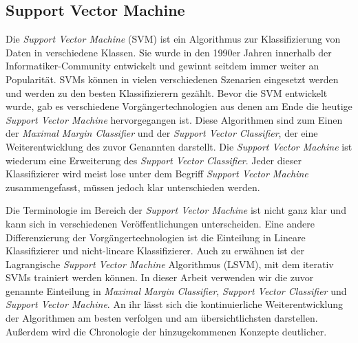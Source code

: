 \subsection{Support Vector Machine} \label{ssec:svm}
Die \textit{Support Vector Machine} (SVM) ist ein Algorithmus zur Klassifizierung von Daten in verschiedene Klassen.
Sie wurde in den 1990er Jahren innerhalb der Informatiker-Community entwickelt und gewinnt seitdem immer weiter an Popularität.
SVMs können in vielen verschiedenen Szenarien eingesetzt werden und werden zu den besten Klassifizierern gezählt.
Bevor die SVM entwickelt wurde, gab es verschiedene Vorgängertechnologien aus denen am Ende die heutige \textit{Support Vector Machine} hervorgegangen ist. 
Diese Algorithmen sind zum Einen der \textit{Maximal Margin Classifier} und der \textit{Support Vector Classifier}, 
der eine Weiterentwicklung des zuvor Genannten darstellt.
Die \textit{Support Vector Machine} ist wiederum eine Erweiterung des \textit{Support Vector Classifier}.
Jeder dieser Klassifizierer wird meist lose unter dem Begriff \textit{Support Vector Machine} zusammengefasst,
müssen jedoch klar unterschieden werden.\cite[S. 337]{james_2013}

Die Terminologie im Bereich der \textit{Support Vector Machine} ist nicht ganz klar und kann sich in verschiedenen Veröffentlichungen unterscheiden.
Eine andere Differenzierung der Vorgängertechnologien ist die Einteilung in Lineare Klassifizierer und nicht-lineare Klassifizierer.
Auch zu erwähnen ist der Lagrangische \textit{Support Vector Machine} Algorithmus (LSVM), mit dem iterativ SVMs trainiert werden können.\cite[S. 207]{suthaharan_2015}
In dieser Arbeit verwenden wir die zuvor genannte Einteilung in \textit{Maximal Margin Classifier}, \textit{Support Vector Classifier}
und \textit{Support Vector Machine}. An ihr lässt sich die kontinuierliche Weiterentwicklung der Algorithmen am besten verfolgen und am übersichtlichsten darstellen.
Außerdem wird die Chronologie der hinzugekommenen Konzepte deutlicher.

